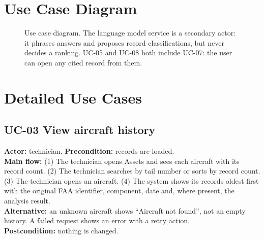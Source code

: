 \section{Use Case Diagram}
\begin{figure}[htb]
\centering
\newcommand{\stickman}[2]{\begin{scope}[shift={(#1)}]\draw (0,0.55) circle (0.16);\draw (0,0.39)--(0,-0.1);\draw (-0.26,0.22)--(0.26,0.22);\draw (0,-0.1)--(-0.2,-0.52);\draw (0,-0.1)--(0.2,-0.52);\node[below,align=center,font=\footnotesize] at (0,-0.5) {#2};\end{scope}}
\caption{Use case diagram. The language model service is a secondary actor: it phrases answers and proposes record classifications, but never decides a ranking. UC-05 and UC-08 both include UC-07: the user can open any cited record from them.}\label{fig:usecase}
\end{figure}

\section{Detailed Use Cases}
\subsection*{UC-03 View aircraft history}
\textbf{Actor:} technician. \textbf{Precondition:} records are loaded.\\
\textbf{Main flow:} (1) The technician opens Assets and sees each aircraft with its record count. (2) The technician searches by tail number or sorts by record count. (3) The technician opens an aircraft. (4) The system shows its records oldest first with the original FAA identifier, component, date and, where present, the analysis result.\\
\textbf{Alternative:} an unknown aircraft shows ``Aircraft not found'', not an empty history. A failed request shows an error with a retry action.\\
\textbf{Postcondition:} nothing is changed.

